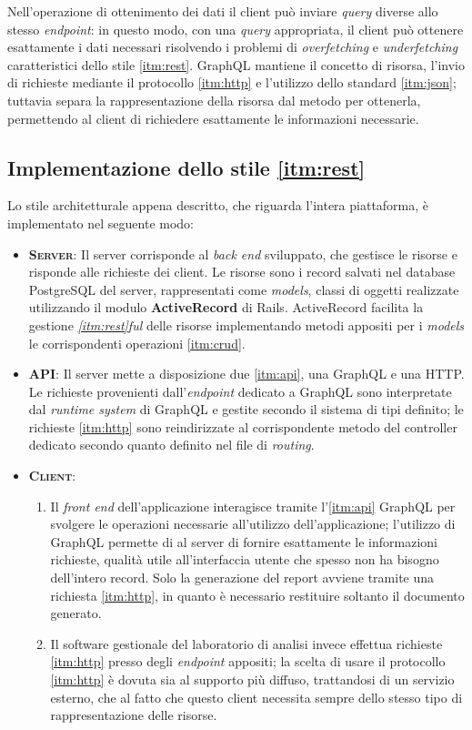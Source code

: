 Nell'operazione di ottenimento dei dati il client può inviare \textit{query} diverse allo stesso \textit{endpoint}: in questo modo, con una \textit{query} appropriata, il client può ottenere esattamente i dati necessari risolvendo i problemi di \textit{overfetching} e \textit{underfetching} caratteristici dello stile \ref{itm:rest}. GraphQL mantiene il concetto di risorsa, l'invio di richieste mediante il protocollo \ref{itm:http} e l'utilizzo dello standard \ref{itm:json}; tuttavia separa la rappresentazione della risorsa dal metodo per ottenerla, permettendo al client di richiedere esattamente le informazioni necessarie.

\subsection{Implementazione dello stile \ref{itm:rest}}
Lo stile architetturale appena descritto, che riguarda l'intera piattaforma, è implementato  nel seguente modo:
\begin{itemize}
    \item \textsc{\textbf{Server}}: Il server corrisponde al \textit{back end} sviluppato, che gestisce le risorse e risponde alle richieste dei client. Le risorse sono i record salvati nel database PostgreSQL del server, rappresentati come \textit{models}, classi di oggetti realizzate utilizzando il modulo \textbf{ActiveRecord} di Rails. ActiveRecord facilita la gestione \textit{\ref{itm:rest}ful} delle risorse implementando metodi appositi per i \textit{models} le corrispondenti operazioni \ref{itm:crud}.
    \item \textsc{\textbf{API}}: Il server mette a disposizione due \ref{itm:api}, una GraphQL e una HTTP. Le richieste provenienti dall'\textit{endpoint} dedicato a GraphQL sono interpretate dal \textit{runtime system} di GraphQL e gestite secondo il sistema di tipi definito; le richieste \ref{itm:http} sono reindirizzate al corrispondente metodo del controller dedicato secondo quanto definito nel file di \textit{routing}.
    \item \textsc{\textbf{Client}}: 
    \begin{enumerate}
        \item Il \textit{front end} dell'applicazione interagisce tramite l'\ref{itm:api} GraphQL per svolgere le operazioni necessarie all'utilizzo dell'applicazione; l'utilizzo di GraphQL permette di al server di fornire esattamente le informazioni richieste, qualità utile all'interfaccia utente che spesso non ha bisogno dell'intero record. Solo la generazione del report avviene tramite una richiesta \ref{itm:http}, in quanto è necessario restituire soltanto il documento generato.
        \item Il software gestionale del laboratorio di analisi invece effettua richieste \ref{itm:http} presso degli \textit{endpoint} appositi; la scelta di usare il protocollo \ref{itm:http} è dovuta sia al supporto più diffuso, trattandosi di un servizio esterno, che al fatto che questo client necessita sempre dello stesso tipo di rappresentazione delle risorse. 
    \end{enumerate} 
\end{itemize}
\vspace{-15pt}
\vspace{-15pt}
